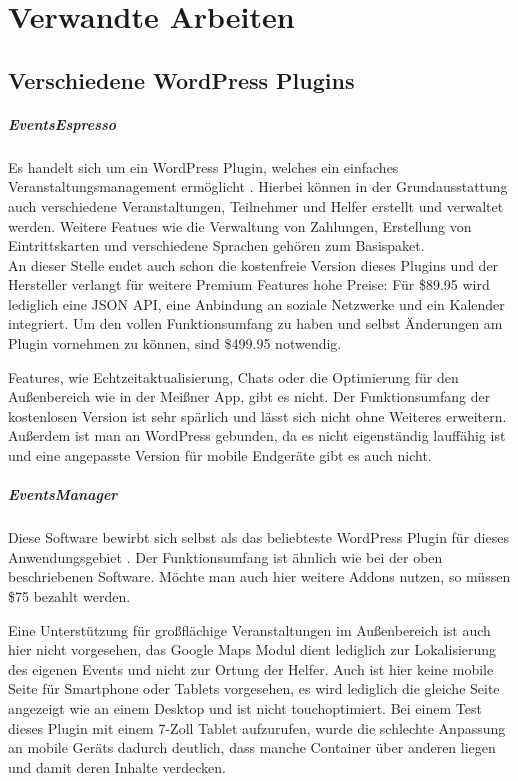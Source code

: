 \chapter{Verwandte Arbeiten}

\section{Verschiedene WordPress Plugins}
\paragraph{EventsEspresso}
Es handelt sich um ein WordPress Plugin, welches ein einfaches Veranstaltungsmanagement ermöglicht \cite{eventespresso}. Hierbei können in der Grundausstattung auch verschiedene Veranstaltungen, Teilnehmer und Helfer erstellt und verwaltet werden. Weitere Featues wie die Verwaltung von Zahlungen, Erstellung von Eintrittskarten und verschiedene Sprachen gehören zum Basispaket.\\
An dieser Stelle endet auch schon die kostenfreie Version dieses Plugins und der Hersteller verlangt für weitere Premium Features hohe Preise: Für \$89.95 wird lediglich eine JSON API, eine Anbindung an soziale Netzwerke und ein Kalender integriert. Um den vollen Funktionsumfang zu haben und selbst Änderungen am Plugin vornehmen zu können, sind \$499.95 notwendig.\par

Features, wie Echtzeitaktualisierung, Chats oder die Optimierung für den Außenbereich wie in der Meißner App, gibt es nicht. Der Funktionsumfang der kostenlosen Version ist sehr spärlich und lässt sich nicht ohne Weiteres erweitern. Außerdem ist man an WordPress gebunden, da es nicht eigenständig lauffähig ist und eine angepasste Version für mobile Endgeräte gibt es auch nicht.

\paragraph{EventsManager}
Diese Software bewirbt sich selbst als das beliebteste WordPress Plugin für dieses Anwendungsgebiet \cite{eventsmanager}. Der Funktionsumfang ist ähnlich wie bei der oben beschriebenen Software. Möchte man auch hier weitere Addons nutzen, so müssen \$75 bezahlt werden.\par

Eine Unterstützung für großflächige Veranstaltungen im Außenbereich ist auch hier nicht vorgesehen, das Google Maps Modul dient lediglich zur Lokalisierung des eigenen Events und nicht zur Ortung der Helfer. Auch ist hier keine mobile Seite für Smartphone oder Tablets vorgesehen, es wird lediglich die gleiche Seite angezeigt wie an einem Desktop und ist nicht touchoptimiert. Bei einem Test dieses Plugin mit einem 7-Zoll Tablet aufzurufen, wurde die schlechte Anpassung an mobile Geräts dadurch deutlich, dass manche Container über anderen liegen und damit deren Inhalte verdecken.

